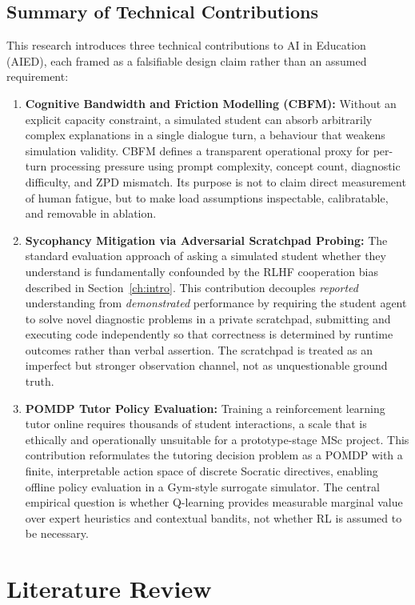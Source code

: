 \documentclass[11pt,a4paper]{report}
\begin{document}
\section{Summary of Technical Contributions}
This research introduces three technical contributions to AI in Education (AIED), each framed as a falsifiable design claim rather than an assumed requirement:
\begin{enumerate}
    \item \textbf{Cognitive Bandwidth and Friction Modelling (CBFM):} Without an explicit capacity constraint, a simulated student can absorb arbitrarily complex explanations in a single dialogue turn, a behaviour that weakens simulation validity. CBFM defines a transparent operational proxy for per-turn processing pressure using prompt complexity, concept count, diagnostic difficulty, and ZPD mismatch. Its purpose is not to claim direct measurement of human fatigue, but to make load assumptions inspectable, calibratable, and removable in ablation.

    \item \textbf{Sycophancy Mitigation via Adversarial Scratchpad Probing:} The standard evaluation approach of asking a simulated student whether they understand is fundamentally confounded by the RLHF cooperation bias described in Section~\ref{ch:intro}. This contribution decouples \textit{reported} understanding from \textit{demonstrated} performance by requiring the student agent to solve novel diagnostic problems in a private scratchpad, submitting and executing code independently so that correctness is determined by runtime outcomes rather than verbal assertion. The scratchpad is treated as an imperfect but stronger observation channel, not as unquestionable ground truth.

    \item \textbf{POMDP Tutor Policy Evaluation:} Training a reinforcement learning tutor online requires thousands of student interactions, a scale that is ethically and operationally unsuitable for a prototype-stage MSc project. This contribution reformulates the tutoring decision problem as a POMDP with a finite, interpretable action space of discrete Socratic directives, enabling offline policy evaluation in a Gym-style surrogate simulator. The central empirical question is whether Q-learning provides measurable marginal value over expert heuristics and contextual bandits, not whether RL is assumed to be necessary.
\end{enumerate}

\chapter{Literature Review}
\end{document}
